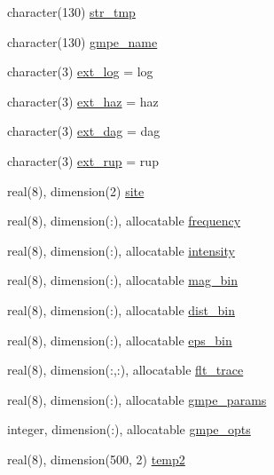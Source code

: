 \begin{DoxyCompactItemize}
\item 
character(130) \hyperlink{namespaceinput__module_aa2d7dcffb5650145aa835a858a0ad35a}{str\+\_\+tmp}
\item 
character(130) \hyperlink{namespaceinput__module_ae241dcd6d1b9e390d39acb1f7ed2f38b}{gmpe\+\_\+name}
\item 
character(3) \hyperlink{namespaceinput__module_a781c43885db3614608686197e48ab56b}{ext\+\_\+log} = \textquotesingle{}log\textquotesingle{}
\item 
character(3) \hyperlink{namespaceinput__module_a860f66b4ca95c52a45651e1a7033e302}{ext\+\_\+haz} = \textquotesingle{}haz\textquotesingle{}
\item 
character(3) \hyperlink{namespaceinput__module_ab8a4b6a5af6ac707c4c8656e4d709bec}{ext\+\_\+dag} = \textquotesingle{}dag\textquotesingle{}
\item 
character(3) \hyperlink{namespaceinput__module_a5ba0c6f56b537efe7105ffc5ef3a9a98}{ext\+\_\+rup} = \textquotesingle{}rup\textquotesingle{}
\item 
real(8), dimension(2) \hyperlink{namespaceinput__module_ab574bddc682ceabd1271512c2b1f4e20}{site}
\item 
real(8), dimension(\+:), allocatable \hyperlink{namespaceinput__module_a2eec881a49e9f9d341e49f123b8435a3}{frequency}
\item 
real(8), dimension(\+:), allocatable \hyperlink{namespaceinput__module_ab8a5b4989aa8a656c28df7fa39f21d03}{intensity}
\item 
real(8), dimension(\+:), allocatable \hyperlink{namespaceinput__module_a1bbdfb734d8c5f5b6370d1ab7fbfb04a}{mag\+\_\+bin}
\item 
real(8), dimension(\+:), allocatable \hyperlink{namespaceinput__module_a760ea371c13a02c658f3ec689a63adad}{dist\+\_\+bin}
\item 
real(8), dimension(\+:), allocatable \hyperlink{namespaceinput__module_a6900d0ebf1a2f906895db37f5b82e495}{eps\+\_\+bin}
\item 
real(8), dimension(\+:,\+:), allocatable \hyperlink{namespaceinput__module_a289e412144c4ad26f482d664135f3972}{flt\+\_\+trace}
\item 
real(8), dimension(\+:), allocatable \hyperlink{namespaceinput__module_ab52a267c1d75b879ad598fa6cc377c4b}{gmpe\+\_\+params}
\item 
integer, dimension(\+:), allocatable \hyperlink{namespaceinput__module_a1c956fb0e5942428da3bdb0c932fd10c}{gmpe\+\_\+opts}
\item 
real(8), dimension(500, 2) \hyperlink{namespaceinput__module_ac72418d482bc6d9b164dc8ff77f80812}{temp2}

\end{DoxyCompactItemize}
